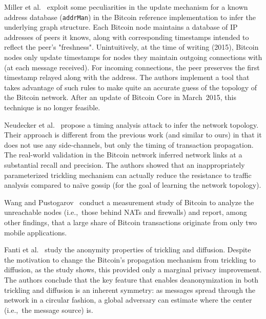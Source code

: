 Miller et al.~\cite{Miller2015} exploit some peculiarities in the update mechanism for a known address database (\texttt{addrMan}) in the Bitcoin reference implementation to infer the underlying graph structure.
Each Bitcoin node maintains a  database of IP addresses of peers it knows, along with corresponding timestamps intended to reflect the peer's "freshness".
Unintuitively, at the time of writing (2015), Bitcoin nodes only update timestamps for nodes they maintain outgoing connections with (at each message received).
For incoming connections, the peer preserves the first timestamp relayed along with the address.
The authors implement a tool that takes advantage of such rules to make quite an accurate guess of the topology of the Bitcoin network.
After an update of Bitcoin Core in March~2015, this technique is no longer feasible.

Neudecker et al.~\cite{Neudecker2016} propose a timing analysis attack to infer the network topology.
Their approach is different from the previous work (and similar to ours) in that it does not use any side-channels, but only the timing of transaction propagation.
The real-world validation in the Bitcoin network inferred network links at a substantial recall and precision.
The authors showed that an inappropriately parameterized trickling mechanism can actually reduce the resistance to traffic analysis compared to na{\"i}ve gossip (for the goal of learning the network topology).

Wang and Pustogarov~\cite{Wang2017} conduct a measurement study of Bitcoin to analyze the unreachable nodes (i.e.,~those behind NATs and firewalls) and report, among other findings, that a large share of Bitcoin transactions originate from only two mobile applications.

Fanti et al.~\cite{Fanti2017} study the anonymity properties of trickling and diffusion.
Despite the motivation to change the Bitcoin's propagation mechanism from trickling to diffusion, as the study shows, this provided only a marginal privacy improvement.
The authors conclude that the key feature that enables deanonymization in both trickling and diffusion is an inherent symmetry: as messages spread through the network in a circular fashion, a global adversary can estimate where the center (i.e.,~the message source) is.

